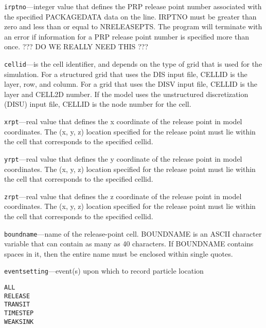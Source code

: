 \begin{description}
\item \texttt{irptno}---integer value that defines the PRP release point number associated with the specified PACKAGEDATA data on the line. IRPTNO must be greater than zero and less than or equal to NRELEASEPTS.  The program will terminate with an error if information for a PRP release point number is specified more than once. ??? DO WE REALLY NEED THIS ???

\item \texttt{cellid}---is the cell identifier, and depends on the type of grid that is used for the simulation.  For a structured grid that uses the DIS input file, CELLID is the layer, row, and column.   For a grid that uses the DISV input file, CELLID is the layer and CELL2D number.  If the model uses the unstructured discretization (DISU) input file, CELLID is the node number for the cell.

\item \texttt{xrpt}---real value that defines the x coordinate of the release point in model coordinates.  The (x, y, z) location specified for the release point must lie within the cell that corresponds to the specified cellid.

\item \texttt{yrpt}---real value that defines the y coordinate of the release point in model coordinates.  The (x, y, z) location specified for the release point must lie within the cell that corresponds to the specified cellid.

\item \texttt{zrpt}---real value that defines the z coordinate of the release point in model coordinates.  The (x, y, z) location specified for the release point must lie within the cell that corresponds to the specified cellid.

\item \texttt{boundname}---name of the release-point cell.  BOUNDNAME is an ASCII character variable that can contain as many as 40 characters.  If BOUNDNAME contains spaces in it, then the entire name must be enclosed within single quotes.

\item \texttt{eventsetting}---event(s) upon which to record particle location

\begin{lstlisting}[style=blockdefinition]
ALL
RELEASE
TRANSIT
TIMESTEP
WEAKSINK
\end{lstlisting}


\end{description}
